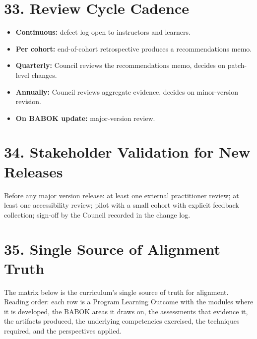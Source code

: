 \documentclass[11pt,letterpaper,oneside]{report}
\begin{document}
\section*{33. Review Cycle Cadence}
\begin{itemize}
  \item \textbf{Continuous:} defect log open to instructors and learners.
  \item \textbf{Per cohort:} end-of-cohort retrospective produces a recommendations memo.
  \item \textbf{Quarterly:} Council reviews the recommendations memo, decides on patch-level changes.
  \item \textbf{Annually:} Council reviews aggregate evidence, decides on minor-version revision.
  \item \textbf{On BABOK update:} major-version review.
\end{itemize}

\section*{34. Stakeholder Validation for New Releases}
Before any major version release: at least one external practitioner review; at least one accessibility review; pilot with a small cohort with explicit feedback collection; sign-off by the Council recorded in the change log.


\section*{35. Single Source of Alignment Truth}
The matrix below is the curriculum's single source of truth for alignment. Reading order: each row is a Program Learning Outcome with the modules where it is developed, the BABOK areas it draws on, the assessments that evidence it, the artifacts produced, the underlying competencies exercised, the techniques required, and the perspectives applied.
\end{document}
